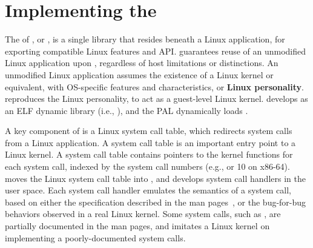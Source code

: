 \section{Implementing the \libos{}}


The \libos{} of \graphene{}, or 
\thelibos{},
is a single library that resides beneath a Linux application,
for exporting compatible Linux features and API.
\thelibos{} guarantees reuse of an unmodified Linux application
upon \thehostabi{},
regardless of host limitations or distinctions.
An unmodified Linux application assumes the existence of a Linux kernel or equivalent,
with OS-specific features and characteristics,
or {\bf Linux personality}.
\thelibos{} reproduces the Linux personality,
to act as a guest-level Linux kernel.
\graphene{} develops \thelibos{} as an ELF dynamic library (i.e., ),
and the PAL dynamically loads \thelibos{}.


A key component of \thelibos{}
is a Linux system call table, which redirects system calls from a Linux application.
A system call table is an important entry point to a Linux kernel.
A system call table contains
pointers to the kernel functions for each system call,
indexed by the system call numbers (e.g.,  or 10 on x86-64).
\graphene{} moves the Linux system call table into \thelibos{},
and develops system call handlers in the user space.
Each system call handler emulates
the semantics of a system call,
based on either the specification %
described in the man pages~\cite{linux-man-syscall},
or the bug-for-bug behaviors
observed in a real Linux kernel.
Some system calls, such as , are partially documented
in the man pages, and \thelibos{} imitates a Linux kernel on implementing a poorly-documented system calls.

